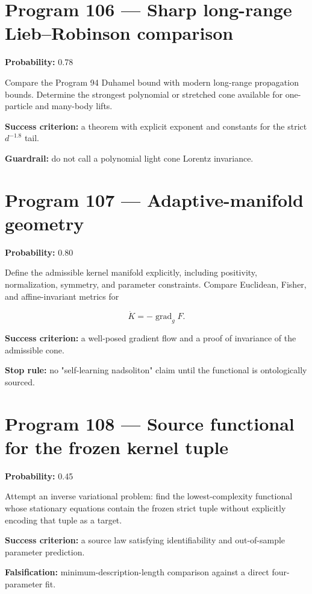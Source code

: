 \documentclass[11pt,a4paper,openany]{report}
\begin{document}
\section{Program 106 --- Sharp long-range Lieb--Robinson comparison}

\textbf{Probability:} 0.78

Compare the Program 94 Duhamel bound with modern long-range propagation bounds. Determine the strongest polynomial or stretched cone available for one-particle and many-body lifts.

\textbf{Success criterion:} a theorem with explicit exponent and constants for the strict \(d^{-1.8}\) tail.

\textbf{Guardrail:} do not call a polynomial light cone Lorentz invariance.

\section{Program 107 --- Adaptive-manifold geometry}

\textbf{Probability:} 0.80

Define the admissible kernel manifold explicitly, including positivity, normalization, symmetry, and parameter constraints. Compare Euclidean, Fisher, and affine-invariant metrics for

\[
\dot K=-\operatorname{grad}_gF.
\]

\textbf{Success criterion:} a well-posed gradient flow and a proof of invariance of the admissible cone.

\textbf{Stop rule:} no "self-learning nadsoliton" claim until the functional is ontologically sourced.

\section{Program 108 --- Source functional for the frozen kernel tuple}

\textbf{Probability:} 0.45

Attempt an inverse variational problem: find the lowest-complexity functional whose stationary equations contain the frozen strict tuple without explicitly encoding that tuple as a target.

\textbf{Success criterion:} a source law satisfying identifiability and out-of-sample parameter prediction.

\textbf{Falsification:} minimum-description-length comparison against a direct four-parameter fit.
\end{document}
